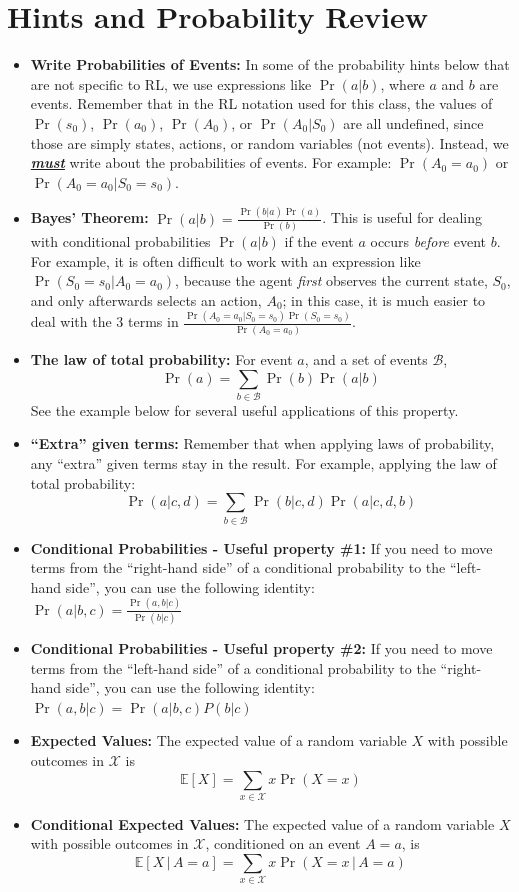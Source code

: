 \documentclass{article}
\begin{document}
\section{Hints and Probability Review}
\label{sec:hints}
    \begin{itemize}
        \item \textbf{Write Probabilities of Events:} In some of the probability hints below that are not specific to RL, we use expressions like $\Pr(a|b)$, where $a$ and $b$ are events.  Remember that in the RL notation used for this class, the values of $\Pr(s_0)$, $\Pr(a_0)$, $\Pr(A_0)$, or $\Pr(A_0 | S_0)$ are all undefined, since those are simply states, actions, or random variables (not events).  Instead, we \underline{\textbf{\textit{must}}} write about the probabilities of events.  For example: $\Pr(A_0 = a_0)$ or $\Pr(A_0 = a_0 | S_0 = s_0)$.
        \item \textbf{Bayes' Theorem:} $\Pr(a|b) = \frac{\Pr(b|a) \Pr(a)}{\Pr(b)}$. This is useful for dealing with conditional probabilities $\Pr(a|b)$ if the event $a$ occurs \textit{before} event $b$.  For example, it is often difficult to work with an expression like $\Pr(S_0 = s_0 | A_0 = a_0)$, because the agent \textit{first} observes the current state, $S_0$, and only afterwards selects an action, $A_0$; in this case, it is much easier to deal with the 3 terms in $\frac{\Pr(A_0 = a_0 | S_0 = s_0) \Pr(S_0 = s_0)}{\Pr(A_0 = a_0)}$.
        \item \textbf{The law of total probability:} For event $a$, and a set of events $\mathcal{B}$,
        $$\Pr(a) = \sum_{b \in \mathcal B} \Pr(b) \Pr(a|b)$$ See the example below for several useful applications of this property.
        \item \textbf{``Extra'' given terms:} Remember that when applying laws of probability, any ``extra'' given terms stay in the result.  For example, applying the law of total probability: $$\Pr(a|c,d) = \sum_{b \in \mathcal B} \Pr(b|c,d) \Pr(a|c,d,b)$$
        \item \textbf{Conditional Probabilities - Useful property \#1:} If you need to move terms from the ``right-hand side'' of a conditional probability to the ``left-hand side'', you can use the following identity:  \\
        $\Pr(a|b,c) = \frac{\Pr(a,b|c)}{\Pr(b|c)}$ 
        \item \textbf{Conditional Probabilities - Useful property \#2:} If you need to move terms from the ``left-hand side'' of a conditional probability to the ``right-hand side'', you can use the following identity:  \\
        $\Pr(a,b|c) = \Pr(a|b,c)P(b|c)$
        \item \textbf{Expected Values:} The expected value of a random variable $X$ with possible outcomes in $\mathcal{X}$ is $$\mathbb{E}[X] = \sum_{x \in \mathcal{X}} x \Pr(X=x)$$
        \item \textbf{Conditional Expected Values:} The expected value of a random variable $X$ with possible outcomes in $\mathcal{X}$, conditioned on an event $A=a$, is $$\mathbb{E}[X\,|\,A=a] = \sum_{x \in \mathcal{X}} x \Pr(X=x \,|\, A=a )$$


\end{itemize}
\end{document}
